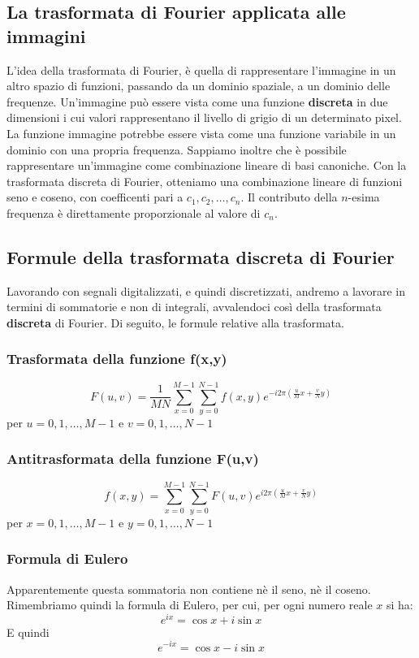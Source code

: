 \documentclass{report}
\begin{document}
	\subsection{La trasformata di Fourier applicata alle immagini}
	L'idea della trasformata di Fourier, è quella di rappresentare l'immagine in un altro spazio di funzioni, passando da un dominio spaziale, a un dominio delle frequenze.
    Un'immagine può essere vista come una funzione \textbf{discreta} in due dimensioni i cui valori rappresentano il livello di grigio di un determinato pixel. 
    La funzione immagine potrebbe essere vista come una funzione variabile in un dominio con una propria frequenza.
    Sappiamo inoltre che è possibile rappresentare un'immagine come combinazione lineare di basi canoniche. Con la trasformata discreta di Fourier, otteniamo una combinazione lineare di funzioni seno e coseno, con coefficenti pari a $c_1, c_2, \dots, c_n$. Il contributo della $n$-esima frequenza è direttamente proporzionale al valore di $c_n$.
    
	\subsection{Formule della trasformata discreta di Fourier}
	Lavorando con segnali digitalizzati, e quindi discretizzati, andremo a lavorare in termini di sommatorie e non di integrali, avvalendoci così della trasformata \textbf{discreta} di Fourier. Di seguito, le formule relative alla trasformata.
	\subsubsection{Trasformata della funzione f(x,y)}
	$$
	F(u,v) = \frac{1}{MN}\sum_{x=0}^{M-1}\sum_{y=0}^{N-1}f(x,y)e^{-i2 \pi (\frac{u}{M}x+ \frac{v}{N}y)}
	$$
	per $u=0,1,\dots,M-1 $ e $ v=0,1,\dots,N-1$
	\subsubsection{Antitrasformata della funzione F(u,v)}
	$$
	f(x,y) = \sum_{x=0}^{M-1}\sum_{y=0}^{N-1}F(u,v)e^{i2 \pi (\frac{u}{M}x+ \frac{v}{N}y)}
	$$
	per $x=0,1,\dots,M-1 $ e $y=0,1,\dots,N-1$
	\subsubsection{Formula di Eulero}
	Apparentemente questa sommatoria non contiene nè il seno, nè il coseno. \\Rimembriamo quindi la formula di Eulero, per cui, per ogni numero reale $x$ si ha:
	$$
	e^{ix}= \cos{x}+i\sin{x}
	$$
	E quindi
	$$
	e^{-ix} = \cos{x}-i\sin{x}
	$$
\end{document}
